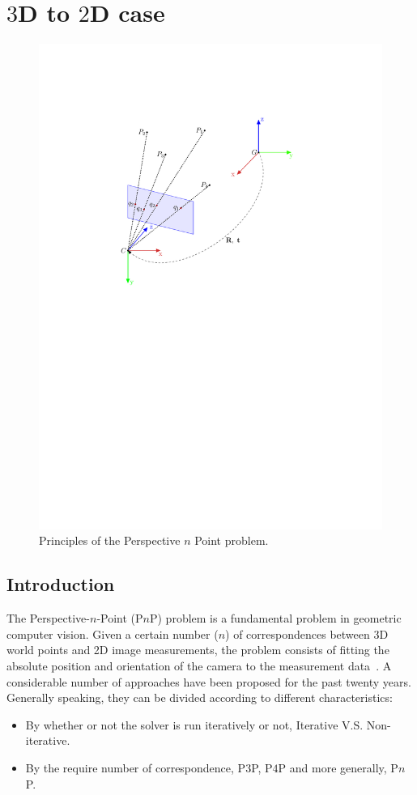 \documentclass[a4paper]{report}
\begin{document}
\chapter{$3$D to $2$D case}
\begin{figure}
\centering
\includegraphics[scale=0.8]{hand_eye_files/vision/figures/pnp.pdf}
\caption{Principles of the Perspective $n$ Point problem.}
\end{figure}
\section{Introduction}
The Perspective-$n$-Point (P$n$P) problem is a fundamental problem in geometric computer vision. Given a certain number ($n$) of correspondences between 3D world points and 2D image measurements, the problem consists of fitting the absolute position and orientation of the camera to the measurement data~\cite{fischler1981random}. A considerable number of approaches have been proposed for the past twenty years. Generally speaking, they can be divided according to different characteristics:
\begin{itemize}
\item By whether or not the solver is run iteratively or not, Iterative V.S. Non-iterative.
\item By the require number of correspondence, P$3$P, P$4$P and more generally, P$n$P.
\end{itemize}
\end{document}
